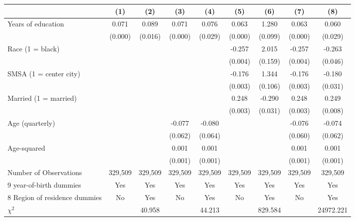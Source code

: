 {
\def\sym#1{\ifmmode^{#1}\else\(^{#1}\)\fi}
\begin{tabular}{l*{8}{c}}
\hline\hline
                    &\multicolumn{1}{c}{(1)}&\multicolumn{1}{c}{(2)}&\multicolumn{1}{c}{(3)}&\multicolumn{1}{c}{(4)}&\multicolumn{1}{c}{(5)}&\multicolumn{1}{c}{(6)}&\multicolumn{1}{c}{(7)}&\multicolumn{1}{c}{(8)}\\
\hline
Years of education  &       0.071&       0.089&       0.071&       0.076&       0.063&       1.280&       0.063&       0.060\\
                    &     (0.000)&     (0.016)&     (0.000)&     (0.029)&     (0.000)&     (0.099)&     (0.000)&     (0.029)\\
Race (1 = black)    &            &            &            &            &      -0.257&       2.015&      -0.257&      -0.263\\
                    &            &            &            &            &     (0.004)&     (0.159)&     (0.004)&     (0.046)\\
SMSA (1 = center city)&            &            &            &            &      -0.176&       1.344&      -0.176&      -0.180\\
                    &            &            &            &            &     (0.003)&     (0.106)&     (0.003)&     (0.031)\\
Married (1 = married)&            &            &            &            &       0.248&      -0.290&       0.248&       0.249\\
                    &            &            &            &            &     (0.003)&     (0.031)&     (0.003)&     (0.008)\\
Age (quarterly)     &            &            &      -0.077&      -0.080&            &            &      -0.076&      -0.074\\
                    &            &            &     (0.062)&     (0.064)&            &            &     (0.060)&     (0.062)\\
Age-squared         &            &            &       0.001&       0.001&            &            &       0.001&       0.001\\
                    &            &            &     (0.001)&     (0.001)&            &            &     (0.001)&     (0.001)\\
\hline
Number of Observations&     329,509&     329,509&     329,509&     329,509&     329,509&     329,509&     329,509&     329,509\\
9 year-of-birth dummies&         Yes&         Yes&         Yes&         Yes&         Yes&         Yes&         Yes&         Yes\\
8 Region of residence dummies&          No&         Yes&          No&         Yes&          No&         Yes&          No&         Yes\\
$\chi^2$            &            &      40.958&            &      44.213&            &     829.584&            &   24972.221\\
\hline\hline
\end{tabular}
}

